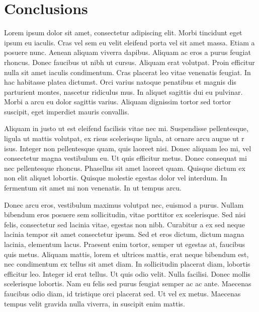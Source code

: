 \documentclass[openany]{book}
\begin{document}
\chapter{Conclusions}
Lorem ipsum dolor sit amet, consectetur adipiscing elit. Morbi tincidunt eget 
ipsum eu iaculis. Cras vel sem eu velit eleifend porta vel sit amet massa. Etiam 
a posuere nunc. Aenean aliquam viverra dapibus. Aliquam ac eros a purus feugiat 
rhoncus. Donec faucibus ut nibh ut cursus. Aliquam erat volutpat. Proin efficitur 
nulla sit amet iaculis condimentum. Cras placerat leo vitae venenatis feugiat. In 
hac habitasse platea dictumst. Orci varius natoque penatibus et magnis dis 
parturient montes, nascetur ridiculus mus. In aliquet sagittis dui eu pulvinar. 
Morbi a arcu eu dolor sagittis varius. Aliquam dignissim tortor sed tortor 
suscipit, eget imperdiet mauris convallis.

Aliquam in justo ut est eleifend facilisis vitae nec mi. Suspendisse pellentesque, 
ligula ut mattis volutpat, ex risus scelerisque ligula, at ornare arcu augue ut r
isus. Integer non pellentesque quam, quis laoreet nisi. Donec aliquam leo mi, vel 
consectetur magna vestibulum eu. Ut quis efficitur metus. Donec consequat mi nec 
pellentesque rhoncus. Phasellus sit amet laoreet quam. Quisque dictum ex non elit 
aliquet lobortis. Quisque molestie egestas dolor vel interdum. In fermentum sit 
amet mi non venenatis. In ut tempus arcu.

Donec arcu eros, vestibulum maximus volutpat nec, euismod a purus. Nullam bibendum 
eros posuere sem sollicitudin, vitae porttitor ex scelerisque. Sed nisi felis, 
consectetur sed lacinia vitae, egestas non nibh. Curabitur a ex sed neque lacinia 
tempor sit amet consectetur ipsum. Sed et eros dictum, dictum magna lacinia, 
elementum lacus. Praesent enim tortor, semper ut egestas at, faucibus quis metus. 
Aliquam mattis, lorem et ultrices mattis, erat neque bibendum est, nec condimentum 
ex tellus sit amet diam. In sollicitudin placerat diam, lobortis efficitur leo. 
Integer id erat tellus. Ut quis odio velit. Nulla facilisi. Donec mollis 
scelerisque lobortis. Nam eu felis sed purus feugiat semper ac ac ante. Maecenas 
faucibus odio diam, id tristique orci placerat sed. Ut vel ex metus. Maecenas 
tempus velit gravida nulla viverra, in suscipit enim mattis.
\end{document}
